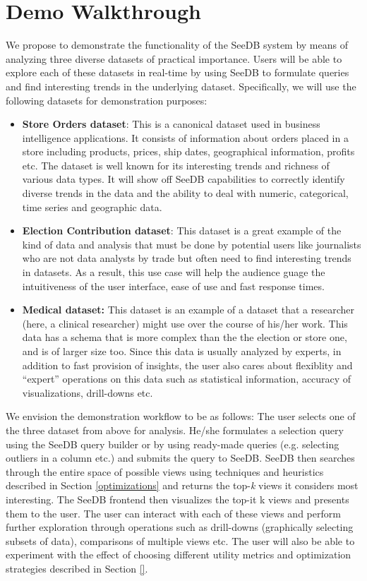 \section{Demo Walkthrough}
\label{demo-walkthrough}

We propose to demonstrate the functionality of the SeeDB system by means of
analyzing three diverse datasets of practical importance. Users will be able to
explore each of these datasets in real-time by using SeeDB to formulate
queries and find interesting trends in the underlying dataset. Specifically, we
will use the following datasets for demonstration purposes:

\begin{itemize}
  \item {\bf Store Orders dataset}: This is a canonical dataset used in business
  intelligence applications. It consists of information about orders placed in a
  store including products, prices, ship dates, geographical information,
  profits etc. The dataset is well known for its interesting trends and
  richness of various data types. It will show off SeeDB capabilities to
  correctly identify diverse trends in the data and the ability to deal with
  numeric, categorical, time series and geographic data.
  \item {\bf Election Contribution dataset}: This dataset is a great example of
  the kind of data and analysis that must be done by potential users like
  journalists who are not data analysts by trade but often need to find
  interesting trends in datasets. As a result, this use case will help the
  audience guage the intuitiveness of the user interface, ease of use and fast
  response times.
  \item {\bf Medical dataset:} This dataset is an example of a dataset that a
  researcher (here, a clinical researcher) might use over the course of his/her
  work. This data has a schema that is more complex than the the election
  or store one, and is of larger size too. Since this data is usually analyzed
  by experts, in addition to fast provision of insights, the user also cares about
  flexiblity and ``expert'' operations on this data such as statistical
  information, accuracy of visualizations, drill-downs etc.
\end{itemize}

We envision the demonstration workflow to be as follows: The user selects one of
the three dataset from above for analysis. He/she formulates a selection query
using the SeeDB query builder or by using ready-made queries (e.g. selecting
outliers in a column etc.) and submits the query to SeeDB. SeeDB then searches
through the entire space of possible views using techniques and heuristics
described in Section \ref{optimizations} and returns the top-{\it k} views it
considers most interesting. The SeeDB frontend then visualizes the top-{it k} views and
presents them to the user. The user can interact with each of these views and
perform further exploration through operations such as drill-downs (graphically
selecting subsets of data), comparisons of multiple views etc. The user will
also be able to experiment with the effect of choosing different utility metrics
and optimization strategies described in Section \ref{}.
